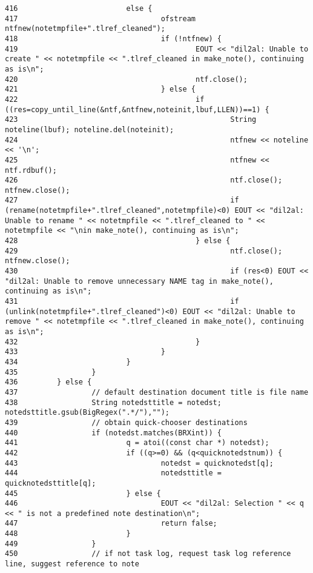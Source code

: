 \begin{verbatim}
416                         else {
417                                 ofstream ntfnew(notetmpfile+".tlref_cleaned");
418                                 if (!ntfnew) {
419                                         EOUT << "dil2al: Unable to create " << notetmpfile << ".tlref_cleaned in make_note(), continuing as is\n";
420                                         ntf.close();
421                                 } else {
422                                         if ((res=copy_until_line(&ntf,&ntfnew,noteinit,lbuf,LLEN))==1) {
423                                                 String noteline(lbuf); noteline.del(noteinit);
424                                                 ntfnew << noteline << '\n';
425                                                 ntfnew << ntf.rdbuf();
426                                                 ntf.close(); ntfnew.close();
427                                                 if (rename(notetmpfile+".tlref_cleaned",notetmpfile)<0) EOUT << "dil2al: Unable to rename " << notetmpfile << ".tlref_cleaned to " << notetmpfile << "\nin make_note(), continuing as is\n";
428                                         } else {
429                                                 ntf.close(); ntfnew.close();
430                                                 if (res<0) EOUT << "dil2al: Unable to remove unnecessary NAME tag in make_note(), continuing as is\n";
431                                                 if (unlink(notetmpfile+".tlref_cleaned")<0) EOUT << "dil2al: Unable to remove " << notetmpfile << ".tlref_cleaned in make_note(), continuing as is\n";
432                                         }
433                                 }
434                         }
435                 }
436         } else {
437                 // default destination document title is file name
438                 String notedsttitle = notedst; notedsttitle.gsub(BigRegex(".*/"),"");
439                 // obtain quick-chooser destinations
440                 if (notedst.matches(BRXint)) {
441                         q = atoi((const char *) notedst);
442                         if ((q>=0) && (q<quicknotedstnum)) {
443                                 notedst = quicknotedst[q];
444                                 notedsttitle = quicknotedsttitle[q];
445                         } else {
446                                 EOUT << "dil2al: Selection " << q << " is not a predefined note destination\n";
447                                 return false;
448                         }
449                 }
450                 // if not task log, request task log reference line, suggest reference to note

\end{verbatim}
